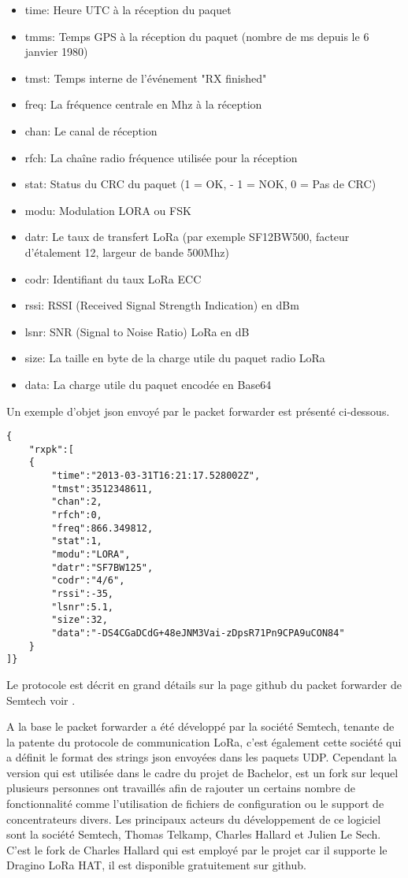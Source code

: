 \begin{itemize}
\item time: Heure UTC à la réception du paquet
\item tmms: Temps GPS à la réception du paquet (nombre de ms depuis le 6 janvier 1980)
\item tmst: Temps interne de l'événement "RX finished"
\item freq: La fréquence centrale en Mhz à la réception
\item chan: Le canal de réception
\item rfch: La chaîne radio fréquence utilisée pour la réception
\item stat: Status du CRC du paquet (1 = OK, - 1 = NOK, 0 = Pas de CRC)
\item modu: Modulation LORA ou FSK
\item datr: Le taux de transfert LoRa (par exemple SF12BW500, facteur d'étalement 12, largeur de bande 500Mhz)
\item codr: Identifiant du taux LoRa ECC
\item rssi: RSSI (Received Signal Strength Indication) en dBm
\item lsnr: SNR (Signal to Noise Ratio) LoRa en dB
\item size: La taille en byte de la charge utile du paquet radio LoRa
\item data: La charge utile du paquet encodée en Base64
\end{itemize}

Un exemple d'objet json envoyé par le packet forwarder est présenté ci-dessous.


\begin{lstlisting}
{
	"rxpk":[
	{
		"time":"2013-03-31T16:21:17.528002Z",
		"tmst":3512348611,
		"chan":2,
		"rfch":0,
		"freq":866.349812,
		"stat":1,
		"modu":"LORA",
		"datr":"SF7BW125",
		"codr":"4/6",
		"rssi":-35,
		"lsnr":5.1,
		"size":32,
		"data":"-DS4CGaDCdG+48eJNM3Vai-zDpsR71Pn9CPA9uCON84"
	}
]}
\end{lstlisting}

Le protocole est décrit en grand détails sur la page github du packet forwarder de Semtech voir \cite{lora-pkt-forwarder-protocol}.

A la base le packet forwarder a été développé par la société Semtech, tenante de la patente du protocole de communication LoRa, c'est également cette société qui a définit le format des strings json envoyées dans les paquets UDP. Cependant la version qui est utilisée dans le cadre du projet de Bachelor, est un fork sur lequel plusieurs personnes ont travaillés afin de rajouter un certains nombre de fonctionnalité comme l'utilisation de fichiers de configuration ou le support de concentrateurs divers. Les principaux acteurs du développement de ce logiciel sont la société Semtech, Thomas Telkamp, Charles Hallard et Julien Le Sech. C'est le fork de Charles Hallard qui est employé par le projet car il supporte le Dragino LoRa HAT, il est disponible gratuitement sur github. \cite{pkt-forwarder-hallard}

